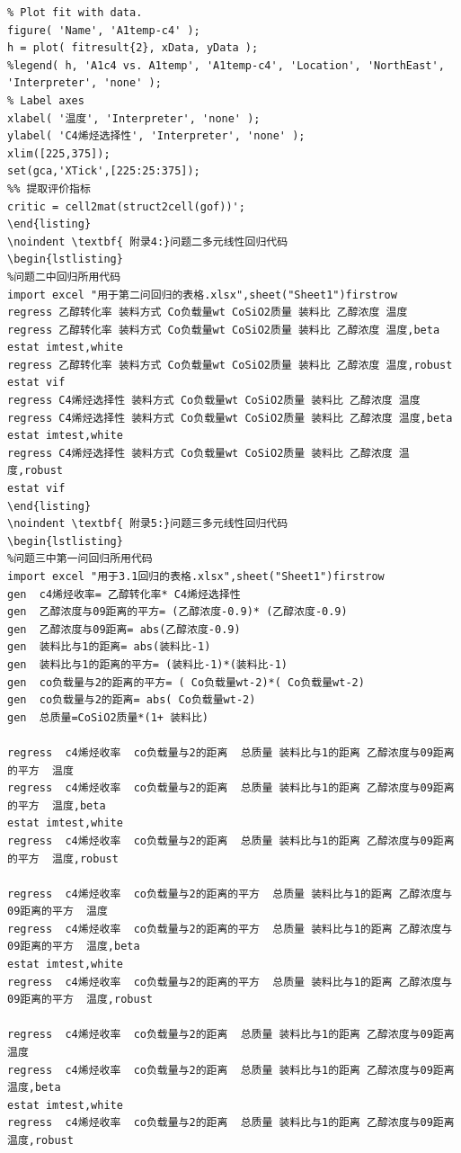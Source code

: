 \documentclass[a4paper,10.5pt]{ctexart}
\begin{document}
\begin{lstlisting}
% Plot fit with data.
figure( 'Name', 'A1temp-c4' );
h = plot( fitresult{2}, xData, yData );
%legend( h, 'A1c4 vs. A1temp', 'A1temp-c4', 'Location', 'NorthEast', 'Interpreter', 'none' );
% Label axes
xlabel( '温度', 'Interpreter', 'none' );
ylabel( 'C4烯烃选择性', 'Interpreter', 'none' );
xlim([225,375]);
set(gca,'XTick',[225:25:375]);
%% 提取评价指标
critic = cell2mat(struct2cell(gof))';
\end{listing}
\noindent \textbf{ 附录4:}问题二多元线性回归代码
\begin{lstlisting}
%问题二中回归所用代码
import excel "用于第二问回归的表格.xlsx",sheet("Sheet1")firstrow
regress 乙醇转化率 装料方式 Co负载量wt CoSiO2质量 装料比 乙醇浓度 温度
regress 乙醇转化率 装料方式 Co负载量wt CoSiO2质量 装料比 乙醇浓度 温度,beta
estat imtest,white
regress 乙醇转化率 装料方式 Co负载量wt CoSiO2质量 装料比 乙醇浓度 温度,robust
estat vif
regress C4烯烃选择性 装料方式 Co负载量wt CoSiO2质量 装料比 乙醇浓度 温度
regress C4烯烃选择性 装料方式 Co负载量wt CoSiO2质量 装料比 乙醇浓度 温度,beta
estat imtest,white
regress C4烯烃选择性 装料方式 Co负载量wt CoSiO2质量 装料比 乙醇浓度 温度,robust
estat vif
\end{listing}
\noindent \textbf{ 附录5:}问题三多元线性回归代码
\begin{lstlisting}
%问题三中第一问回归所用代码
import excel "用于3.1回归的表格.xlsx",sheet("Sheet1")firstrow
gen  c4烯烃收率= 乙醇转化率* C4烯烃选择性
gen  乙醇浓度与09距离的平方= (乙醇浓度-0.9)* (乙醇浓度-0.9)
gen  乙醇浓度与09距离= abs(乙醇浓度-0.9)
gen  装料比与1的距离= abs(装料比-1)
gen  装料比与1的距离的平方= (装料比-1)*(装料比-1)
gen  co负载量与2的距离的平方= ( Co负载量wt-2)*( Co负载量wt-2)
gen  co负载量与2的距离= abs( Co负载量wt-2)
gen  总质量=CoSiO2质量*(1+ 装料比)

regress  c4烯烃收率  co负载量与2的距离  总质量 装料比与1的距离 乙醇浓度与09距离的平方  温度
regress  c4烯烃收率  co负载量与2的距离  总质量 装料比与1的距离 乙醇浓度与09距离的平方  温度,beta
estat imtest,white
regress  c4烯烃收率  co负载量与2的距离  总质量 装料比与1的距离 乙醇浓度与09距离的平方  温度,robust

regress  c4烯烃收率  co负载量与2的距离的平方  总质量 装料比与1的距离 乙醇浓度与09距离的平方  温度
regress  c4烯烃收率  co负载量与2的距离的平方  总质量 装料比与1的距离 乙醇浓度与09距离的平方  温度,beta
estat imtest,white
regress  c4烯烃收率  co负载量与2的距离的平方  总质量 装料比与1的距离 乙醇浓度与09距离的平方  温度,robust

regress  c4烯烃收率  co负载量与2的距离  总质量 装料比与1的距离 乙醇浓度与09距离  温度
regress  c4烯烃收率  co负载量与2的距离  总质量 装料比与1的距离 乙醇浓度与09距离  温度,beta
estat imtest,white
regress  c4烯烃收率  co负载量与2的距离  总质量 装料比与1的距离 乙醇浓度与09距离  温度,robust


\end{lstlisting}
\end{document}
